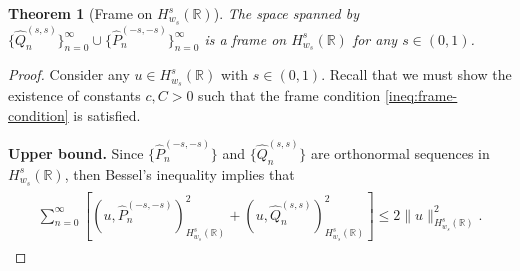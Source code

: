 \documentclass[10pt,a4paper]{article}
\newtheorem{theorem}{Theorem}[section]
\numberwithin{equation}{section}
\begin{document}
\begin{theorem}[Frame on $H^s_{w_s}(\mathbb{R})$]
\label{prop:frame}
The space spanned by $\{\hat{Q}_n^{(s,s)}\}_{n=0}^\infty \cup \{\hat{P}_n^{(-s,-s)}\}_{n=0}^\infty$ is a frame on $H^s_{w_s}(\mathbb{R})$ for any $s \in (0,1)$.
\end{theorem}
\begin{proof}
Consider any $u \in H^s_{w_s}(\mathbb{R})$ with $s \in (0,1)$. Recall that we must show the existence of constants $c, C>0$ such that the frame condition \cref{ineq:frame-condition} is satisfied.

\noindent
\textbf{Upper bound.} Since $\{\hat{P}^{(-s,-s)}_n\}$ and $\{\hat{Q}^{(s,s)}_n\}$ are orthonormal sequences in $H^s_{w_s}(\mathbb{R})$, then Bessel's inequality \cite[Ch.~8, Sec.~4--5]{Yosida1980} implies that
\begin{align}
\begin{split}
\sum_{n=0}^\infty \left[ (u, \hat{P}_n^{(-s,-s)})^2_{H^s_{w_s}(\mathbb{R})} + (u, \hat{Q}_n^{(s,s)})^2_{H^s_{w_s}(\mathbb{R})} \right]
\leq 
2 \| u \|^2_{H^s_{w_s}(\mathbb{R})}.
\end{split}
\end{align}


\end{proof}
\end{document}
